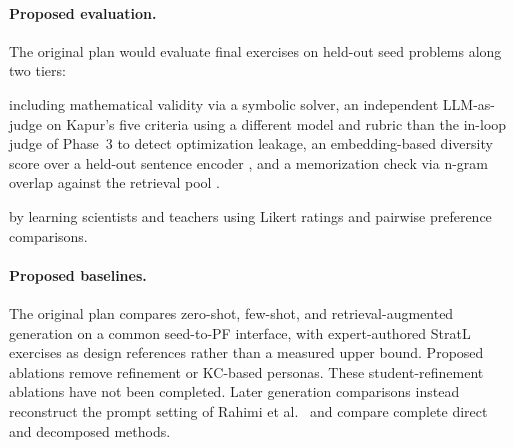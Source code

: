 \documentclass[11pt,a4paper]{article}
\begin{document}
\paragraph{Proposed evaluation.} The original plan would evaluate final exercises on held-out seed problems along two tiers:
\begin{description}
    \setlength{\itemsep}{0.3em}
    \item[\textbf{(i) Automatic metrics}] including mathematical validity via a symbolic solver, an independent LLM-as-judge \cite{zheng2023judging} on Kapur's five criteria using a different model and rubric than the in-loop judge of Phase~3 to detect optimization leakage, an embedding-based diversity score over a held-out sentence encoder \cite{tevet2021diversity}, and a memorization check via n-gram overlap against the retrieval pool \cite{carlini2023memorization}.
    \item[\textbf{(ii) Human expert evaluation}] by learning scientists and teachers using Likert ratings and pairwise preference comparisons.
\end{description}

\paragraph{Proposed baselines.} The original plan compares zero-shot, few-shot, and retrieval-augmented generation on a common seed-to-PF interface, with expert-authored StratL exercises as design references rather than a measured upper bound. Proposed ablations remove refinement or KC-based personas. These student-refinement ablations have not been completed. Later generation comparisons instead reconstruct the prompt setting of Rahimi et al.~\cite{rahimi2025} and compare complete direct and decomposed methods.
 


 
\end{document}
